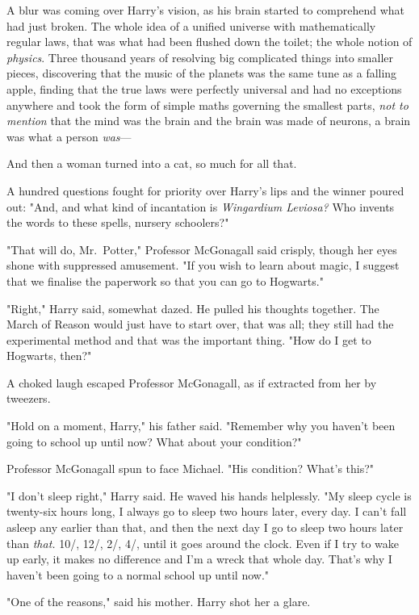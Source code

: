 A blur was coming over Harry's vision, as his brain started to comprehend what
had just broken. The whole idea of a unified universe with mathematically
regular laws, that was what had been flushed down the toilet; the whole notion
of \emph{physics}. Three thousand years of resolving big complicated things
into smaller pieces, discovering that the music of the planets was the same
tune as a falling apple, finding that the true laws were perfectly universal
and had no exceptions anywhere and took the form of simple maths governing the
smallest parts, \emph{not to mention} that the mind was the brain and the brain
was made of neurons, a brain was what a person \emph{was}---

And then a woman turned into a cat, so much for all that.

A hundred questions fought for priority over Harry's lips and the winner poured
out: "And, and what kind of incantation is \emph{Wingardium Leviosa?} Who
invents the words to these spells, nursery schoolers?"

"That will do, Mr.~Potter," Professor McGonagall said crisply, though her eyes
shone with suppressed amusement. "If you wish to learn about magic, I suggest
that we finalise the paperwork so that you can go to Hogwarts."

"Right," Harry said, somewhat dazed. He pulled his thoughts together. The March
of Reason would just have to start over, that was all; they still had the
experimental method and that was the important thing. "How do I get to
Hogwarts, then?"

A choked laugh escaped Professor McGonagall, as if extracted from her by
tweezers.

"Hold on a moment, Harry," his father said. "Remember why you haven't been
going to school up until now? What about your condition?"

Professor McGonagall spun to face Michael. "His condition? What's this?"

"I don't sleep right," Harry said. He waved his hands helplessly. "My sleep
cycle is twenty-six hours long, I always go to sleep two hours later, every
day. I can't fall asleep any earlier than that, and then the next day I go to
sleep two hours later than \emph{that.} 10\PM/, 12\AM/, 2\AM/, 4\AM/, until it goes
around the clock. Even if I try to wake up early, it makes no difference and
I'm a wreck that whole day. That's why I haven't been going to a normal school
up until now."

"One of the reasons," said his mother. Harry shot her a glare.

